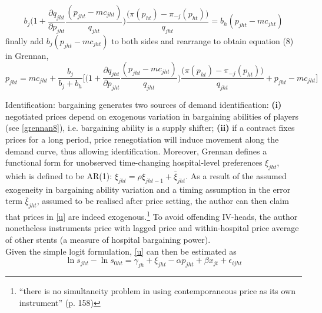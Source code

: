 \documentclass[11pt]{article}
\numberwithin{equation}{section}
\begin{document}
\begin{equation*}
b_j \bigg( 1 + \frac{\partial q_{jht}}{\partial p_{jht}} \frac{(p_{jht} - mc_{jht})}{q_{jht}} \bigg) \frac{ \big(\pi(p_{ht}) - \pi_{-j} (p_{ht})\big)}{q_{jht}}= b_h (p_{jht} - mc_{jht})
\end{equation*}
finally add $b_j(p_{jht} - mc_{jht})$ to both sides and rearrange to obtain equation (8) in Grennan,
\begin{equation}
\label{grennan8}
	p_{jht} = mc_{jht} + \frac{b_j}{b_j + b_h} \bigg[\bigg( 1 + \frac{\partial q_{jht}}{\partial p_{jht}} \frac{(p_{jht} - mc_{jht})}{q_{jht}} \bigg) \frac{ \big(\pi(p_{ht}) - \pi_{-j} (p_{ht})\big)}{q_{jht}} + p_{jht} - mc_{jht} \bigg]
\end{equation}

Identification: bargaining generates two sources of demand identification: \textbf{(i)} negotiated prices depend on exogenous variation in bargaining abilities of players (see \eqref{grennan8}), i.e. bargaining ability is a supply shifter; \textbf{(ii)} if a contract fixes prices for a long period, price renegotiation will induce movement along the demand curve, thus allowing identification. Moreover, Grennan defines a functional form for unobserved time-changing hospital-level preferences $\xi_{jht}$, which is defined to be AR(1): $\xi_{jht} = \rho \xi_{jht-1} + \bar{\xi}_{jht}$.
As a result of the assumed exogeneity in bargaining ability variation and a timing assumption in the error term $\bar{\xi}_{jht}$, assumed to be realised after price setting, the author can then claim that prices in \eqref{u} are indeed exogenous.\footnote{``there is no simultaneity problem in using contemporaneous price as its own instrument'' (p. 158)} To avoid offending IV-heads, the author nonetheless instruments price with lagged price and within-hospital price average of other stents (a measure of hospital bargaining power).  \\

Given the simple logit formulation, \eqref{u} can then be estimated as
\begin{equation*}
	\ln s_{jht} - \ln s_{0ht} =  \gamma_{jh} + \xi_{jht} - \alpha p_{jht} + \beta x_{jt} + \epsilon_{ijht}
\end{equation*}
\end{document}
